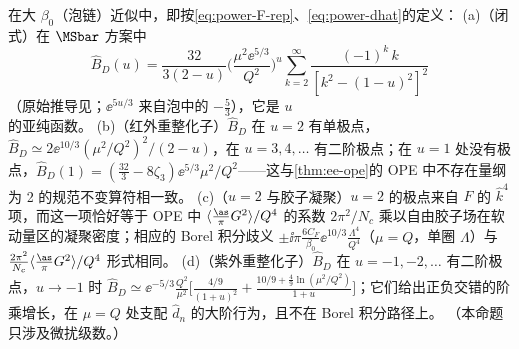 \begin{proposition}\label{prop:power-adler-large-beta0}
在大 $\beta_0$（泡链）近似中，即按\eqref{eq:power-F-rep}、\eqref{eq:power-dhat}的定义：
(a)（闭式）在 $\MSbar$ 方案中
\begin{equation}\label{eq:power-adler-borel}
\hat B_D(u)=\frac{32}{3(2-u)}\Big(\frac{\mu^2\ee^{5/3}}{Q^2}\Big)^{u}\sum_{k=2}^\infty\frac{(-1)^k\,k}{[k^2-(1-u)^2]^2}
\end{equation}
\cite[式~(5.10)]{Beneke1999}（原始推导见\cite{Beneke1993,Broadhurst1993}；$\ee^{5u/3}$ 来自泡中的 $-\frac53$），它是 $u$ 的亚纯函数。
(b)（红外重整化子）$\hat B_D$ 在 $u=2$ 有单极点，$\hat B_D\simeq2\ee^{10/3}(\mu^2/Q^2)^2/(2-u)$，在 $u=3,4,\dots$ 有二阶极点；在 $u=1$ 处没有极点，$\hat B_D(1)=(\frac{32}{3}-8\zeta_3)\ee^{5/3}\mu^2/Q^2$——这与\cref{thm:ee-ope}的 OPE 中不存在量纲为 2 的规范不变算符相一致。
(c)（$u=2$ 与胶子凝聚）$u=2$ 的极点来自 $F$ 的 $\hat k^4$ 项，而这一项恰好等于 OPE 中 $\langle\frac{\as}{\pi}G^2\rangle/Q^4$ 的系数 $2\pi^2/N_c$ 乘以自由胶子场在软动量区的凝聚密度；相应的 Borel 积分歧义 $\pm\ii\pi\frac{6C_F}{\beta_0}\ee^{10/3}\frac{\Lambda^4}{Q^4}$（$\mu=Q$，单圈 $\Lambda$）与 $\frac{2\pi^2}{N_c}\langle\frac{\as}{\pi}G^2\rangle/Q^4$ 形式相同。
(d)（紫外重整化子）$\hat B_D$ 在 $u=-1,-2,\dots$ 有二阶极点，$u\to-1$ 时 $\hat B_D\simeq\ee^{-5/3}\frac{Q^2}{\mu^2}\big[\frac{4/9}{(1+u)^2}+\frac{10/9+\frac49\ln(\mu^2/Q^2)}{1+u}\big]$；它们给出正负交错的阶乘增长，在 $\mu=Q$ 处支配 $\hat d_n$ 的大阶行为，且不在 Borel 积分路径上。
（本命题只涉及微扰级数。）
\end{proposition}

